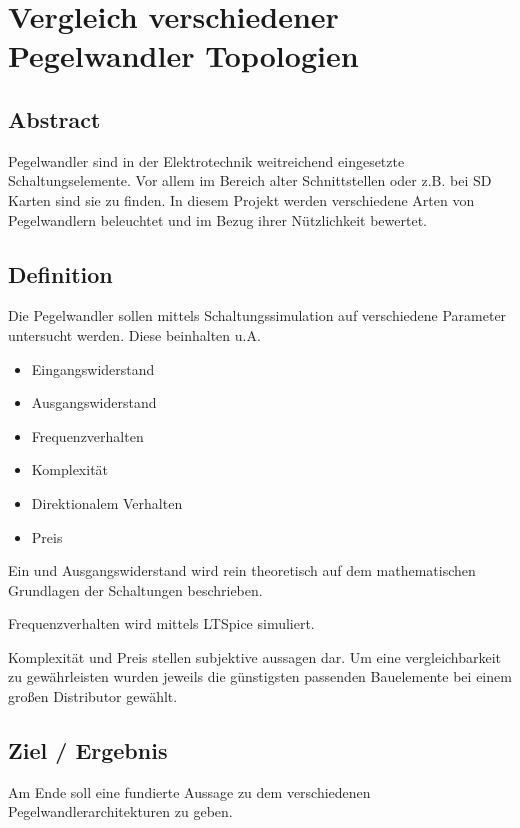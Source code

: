 \section{Vergleich verschiedener Pegelwandler Topologien 
}\label{sec:proj-title-long}

\subsection{Abstract
}\label{subsec:proj-abstract}

Pegelwandler sind in der Elektrotechnik weitreichend eingesetzte Schaltungselemente.
Vor allem im Bereich alter Schnittstellen oder z.B. bei SD Karten sind sie zu finden.
In diesem Projekt werden verschiedene Arten von Pegelwandlern beleuchtet und im Bezug ihrer Nützlichkeit bewertet.

\subsection{Definition
}\label{subsec:proj-def}

Die Pegelwandler sollen mittels Schaltungssimulation auf verschiedene Parameter untersucht werden.
Diese beinhalten u.A. 
\begin{itemize}
  \item Eingangswiderstand
  \item Ausgangswiderstand
  \item Frequenzverhalten
  \item Komplexität
  \item Direktionalem Verhalten
  \item Preis
\end{itemize}

Ein und Ausgangswiderstand wird rein theoretisch auf dem mathematischen Grundlagen der Schaltungen beschrieben.

Frequenzverhalten wird mittels LTSpice simuliert.

Komplexität und Preis stellen subjektive aussagen dar. Um eine vergleichbarkeit zu gewährleisten wurden jeweils die günstigsten passenden Bauelemente bei einem großen Distributor gewählt.



\subsection{Ziel / Ergebnis
}\label{subsec:proj-target}

Am Ende soll eine fundierte Aussage zu dem verschiedenen Pegelwandlerarchitekturen zu geben.

